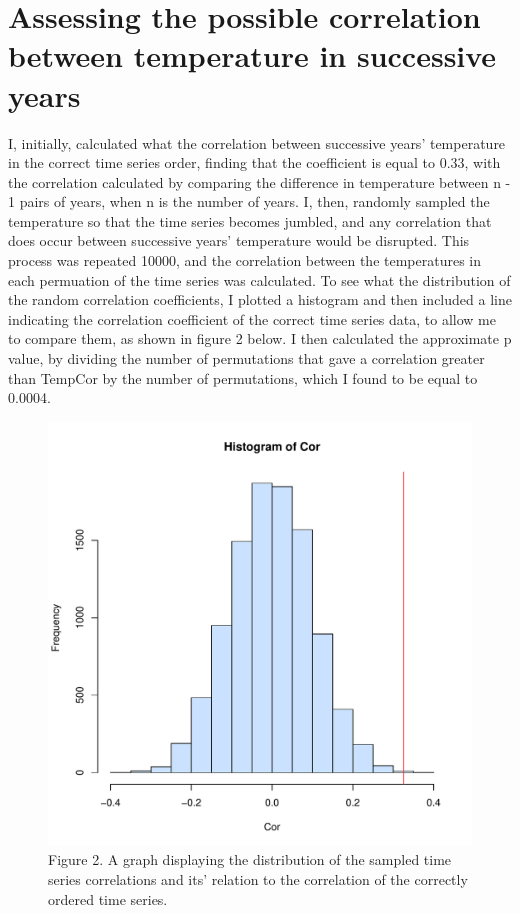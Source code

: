 \documentclass[12pt]{article}
\begin{document}
    \section{Assessing the possible correlation between temperature in successive years}
    I, initially, calculated what the correlation between successive years' temperature
    in the correct time series order, finding that the coefficient is equal to 0.33,
    with the correlation calculated by comparing the difference in temperature between
    n - 1 pairs of years, when n is the number of years.
    I, then, randomly sampled the temperature so that the time series becomes jumbled,
    and any correlation that does occur between successive years' temperature would be
    disrupted. This process was repeated 10000, and the correlation between the
    temperatures in each permuation of the time series was calculated.
    To see what the distribution of the random correlation coefficients, I plotted a
    histogram and then included a line indicating the correlation coefficient of
    the correct time series data, to allow me to compare them, as shown in figure 2 below. 
    I then calculated the approximate p value, by dividing the number of
    permutations that gave a correlation greater than TempCor by the number of
    permutations, which I found to be equal to 0.0004.

    \begin{figure}
        \includegraphics[width = 1\textwidth]{TAutoCorr_histogram.pdf}
        \caption{Figure 2. A graph displaying the distribution of the sampled time series
        correlations and its' relation to the correlation of the correctly ordered time
        series.}
    \end{figure}
    
\end{document}
